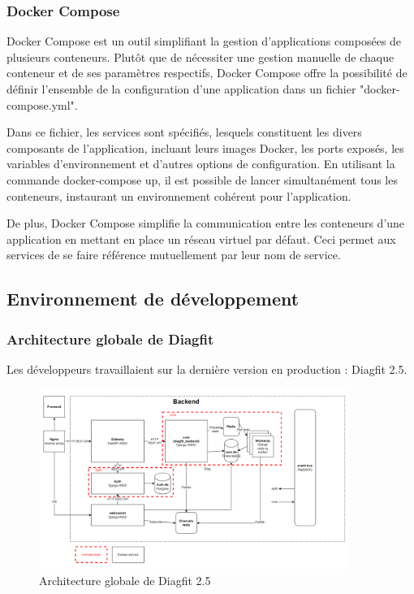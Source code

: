 \subsubsection{Docker Compose}
Docker Compose est un outil simplifiant la gestion d'applications composées de plusieurs conteneurs.
Plutôt que de nécessiter une gestion manuelle de chaque conteneur et de ses paramètres respectifs, Docker Compose offre la possibilité de définir l'ensemble de la configuration d'une application dans un fichier "docker-compose.yml".

Dans ce fichier, les services sont spécifiés, lesquels constituent les divers composants de l'application, incluant leurs images Docker, les ports exposés, les variables d'environnement et d'autres options de configuration.
En utilisant la commande docker-compose up, il est possible de lancer simultanément tous les conteneurs, instaurant un environnement cohérent pour l'application.

De plus, Docker Compose simplifie la communication entre les conteneurs d'une application en mettant en place un réseau virtuel par défaut.
Ceci permet aux services de se faire référence mutuellement par leur nom de service.

\subsection{Environnement de développement}
\subsubsection{Architecture globale de Diagfit}
Les développeurs travaillaient sur la dernière version en production : Diagfit 2.5.

\begin{figure}[ht!]
    \centering
    \includegraphics[width=0.9\textwidth]{paper/figures/archi2-5.png}
    \caption{Architecture globale de Diagfit 2.5}
    \label{fig:archi2-5}
\end{figure}

